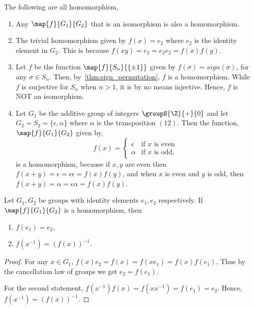 \begin{Example}
    The following are all homomorphism,
    \begin{enumerate}
	\item
	    Any $\map{f}{G_1}{G_2}$ that is an isomorphism is also a homomorphism.
	\item
	    The trivial homomorphism given by $f(x) = e_2$ where $e_2$ is the identity element in $G_2$. This is
	    because $f(xy) = e_2 = e_2e_2 = f(x)f(y)$.
	\item
	    Let $f$ be the function $\map{f}{S_n}{\lbrace \pm 1\rbrace}$ given by $f(\sigma) = sign(\sigma)$,
	    for any $\sigma \in S_n$. Then, by~\ref{thm:sign_permutation}, $f$ is a homomorphism. While $f$ is
	    surjective for $S_n$ when $n > 1$, it is by no means injective. Hence, $f$ is NOT an isomorphism.
	\item
	    Let $G_1$ be the additive group of integers $\groupS{\Z}{+}{0}$ and let $G_2 = S_2 =
	    \lbrace \epsilon,\alpha\rbrace$ where $\alpha$ is the transposition $(1 2)$. Then the function,
	    $\map{f}{G_1}{G_2}$ given by,
	    \begin{equation*}
		f(x) = 
		\begin{cases}
		    \epsilon &\text{if $x$ is even}\\
		    \alpha &\text{if $x$ is odd},
		\end{cases}
	    \end{equation*}
	    is a homomorphism, because if $x,y$ are even then $f(x + y) = \epsilon = \epsilon\epsilon =
	    f(x)f(y)$, and
	    when $x$ is even and $y$ is odd, then $f(x + y) = \alpha = \epsilon\alpha= f(x)f(y)$.
    \end{enumerate}
\end{Example}
\begin{Proposition}\label{prop:hom_prop_group}
    Let $G_1,G_2$ be groups with identity elements $e_1,e_2$ respectively. If $\map{f}{G_1}{G_2}$ is a
    homomorphism, then
    \begin{enumerate}
	\item
	    $f(e_1) = e_2$,
	\item
	    $f(x^{-1}) = {(f(x))}^{-1}$.
    \end{enumerate}
\end{Proposition}

\begin{proof}
    For any $x \in G_1$, $f(x)e_2 = f(x) = f(x e_1) = f(x)f(e_1)$. Thus by the cancellation law of groups we
    get $e_2 = f(e_1)$. 

    For the second statement, ${f(x^{-1})}f(x) = f(x x^{-1}) = f(e_1) = e_2$. Hence, 
    $f(x^{-1}) = {(f(x))}^{-1}$.
\end{proof}

